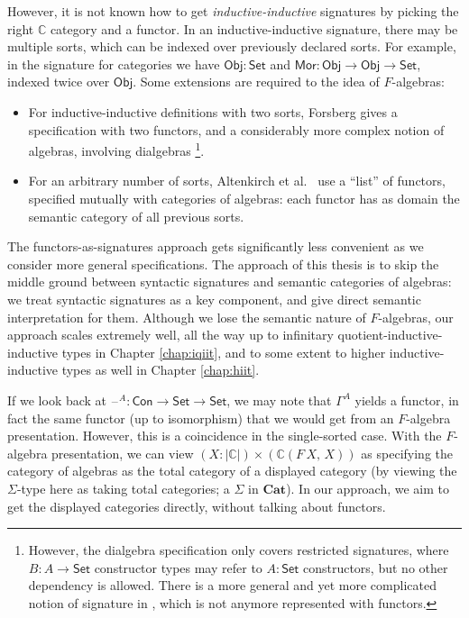 \documentclass[12pt,a4paper,twoside,openany]{book}
\theoremstyle{remark}
\theoremstyle{definition}
\theoremstyle{theorem}
\newcommand{\ms}[1]{\mathsf{#1}}
\newcommand{\mbb}[1]{\mathbb{#1}}
\newcommand{\mbf}[1]{\mathbf{#1}}
\newcommand{\Con}{\mathsf{Con}}
\newcommand{\blank}{\mathord{\hspace{1pt}\text{--}\hspace{1pt}}}
\newcommand{\Set}{\mathsf{Set}}
\newcommand{\Mor}{\ms{Mor}}
\newcommand{\Obj}{\ms{Obj}}
\begin{document}
However, it is not known how to get \emph{inductive-inductive} signatures by
picking the right $\mbb{C}$ category and a functor. In an inductive-inductive
signature, there may be multiple sorts, which can be indexed over previously
declared sorts. For example, in the signature for categories we have $\Obj :
\Set$ and $\Mor : \Obj \to \Obj \to \Set$, indexed twice over $\Obj$. Some
extensions are required to the idea of $F$-algebras:
\begin{itemize}
\item
  For inductive-inductive definitions with two sorts, Forsberg gives a
  specification with two functors, and a considerably more complex notion of
  algebras, involving dialgebras \cite{forsberg-phd}\footnote{However, the
  dialgebra specification only covers restricted signatures, where $B : A \to
  \Set$ constructor types may refer to $A : \Set$ constructors, but no other
  dependency is allowed.  There is a more general and yet more complicated
  notion of signature in \cite{forsberg-phd}, which is not anymore represented
  with functors.}.
\item
  For an arbitrary number of sorts, Altenkirch et
  al.\ \cite{altenkirch18qiit} use a ``list'' of functors, specified mutually
  with categories of algebras: each functor has as domain the semantic category
  of all previous sorts.
\end{itemize}

The functors-as-signatures approach gets significantly less convenient as we
consider more general specifications. The approach of this thesis is to skip the
middle ground between syntactic signatures and semantic categories of algebras:
we treat syntactic signatures as a key component, and give direct semantic
interpretation for them. Although we lose the semantic nature of $F$-algebras,
our approach scales extremely well, all the way up to infinitary
quotient-inductive-inductive types in Chapter \ref{chap:iqiit}, and to some
extent to higher inductive-inductive types as well in Chapter \ref{chap:hiit}.

If we look back at $\blank^A : \Con \to \Set \to \Set$, we may note that
$\Gamma^A$ yields a functor, in fact the same functor (up to isomorphism) that
we would get from an $F$-algebra presentation. However, this is a coincidence in
the single-sorted case. With the $F$-algebra presentation, we can view $(X :
|\mbb{C}|) \times (\mbb{C}(F\,X,\,X))$ as specifying the category of algebras as
the total category of a displayed category (by viewing the $\Sigma$-type here as
taking total categories; a $\Sigma$ in $\mbf{Cat}$). In our approach, we aim to
get the displayed categories directly, without talking about functors.
\end{document}
